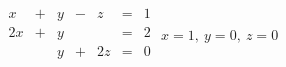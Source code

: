 {$\begin{array}{ccccccc}
x&+&y&-&z&=&1\\
2x&+&y&&&=&2\\
&&y&+&2z&=&0\\
\end{array}$}
{$x =1,\ y=0,\ z=0$}